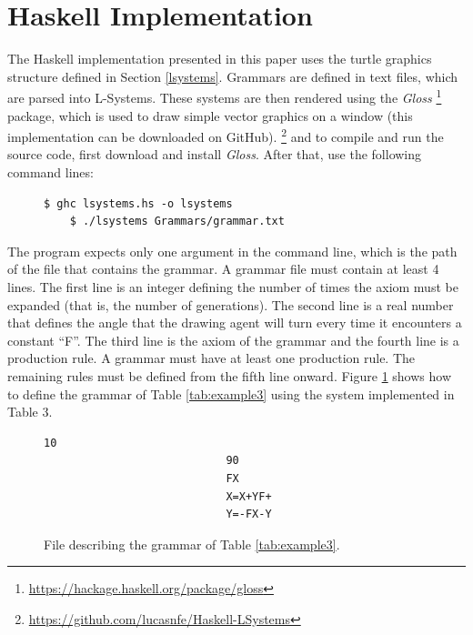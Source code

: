 \documentclass{article}
\begin{document}
\section{Haskell Implementation}
\label{implementation}

The Haskell implementation presented in this paper uses the turtle graphics
structure defined in Section \ref{lsystems}. Grammars are defined in text files,
which are parsed into L-Systems. These systems are then rendered using the \textit{Gloss}
\footnote{\url{https://hackage.haskell.org/package/gloss}} package, which is used to draw
simple vector graphics on a window (this implementation can be downloaded on GitHub).
\footnote{\url{https://github.com/lucasnfe/Haskell-LSystems}} and to compile and run the
source code, first download and install \textit{Gloss}. After that, use the following command lines:

\begin{figure}[!h]
\centering
\begin{lstlisting}[style=BashStyle]
    $ ghc lsystems.hs -o lsystems
    $ ./lsystems Grammars/grammar.txt
\end{lstlisting}
\vskip -6pt
\end{figure}

The program expects only one argument in the command line, which is the path of
the file that contains the grammar. A grammar file must contain at least 4 lines.
The first line is an integer defining the number of times the axiom must be expanded (that is, the number of generations). The second line is a real number that defines the angle that
the drawing agent will turn every time it encounters a constant ``F''. The third
line is the axiom of the grammar and the fourth line is a production rule. A grammar must have at least one production rule. The
remaining rules must be defined from the fifth line onward. Figure \ref{fig:file} shows how
to define the grammar of Table \ref{tab:example3} using the system implemented in Table 3.

\begin{figure}[!h]
\centering
\begin{lstlisting}[style=TextStyle]
                            10
                            90
                            FX
                            X=X+YF+
                            Y=-FX-Y
\end{lstlisting}
\vskip -6pt
\caption{File describing the grammar of Table \ref{tab:example3}.}
\label{fig:file}
\end{figure}
\end{document}
